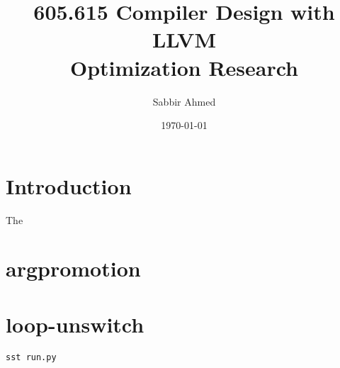 \documentclass[titlepage]{article}
\title{605.615 Compiler Design with LLVM \\ Optimization Research}
\author{Sabbir Ahmed}
\date{\today}
\begin{document}
\maketitle

\section{Introduction} The

\section{argpromotion}

\section{loop-unswitch}

\begin{lstlisting}[caption=A typical method to run the user's model in the SST framework,style=customC++]
sst run.py
\end{lstlisting}



\end{document}
